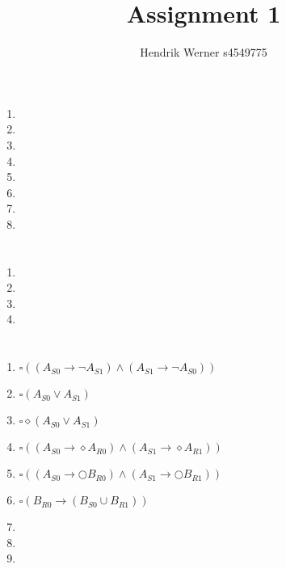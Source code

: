 \documentclass[12pt, a4paper]{article}
\title{Assignment 1}
\author{Hendrik Werner s4549775}
\begin{document}
\maketitle

\section{} %
\begin{enumerate}[a]
	\item %
	\item %
	\item %
	\item %
	\item %
	\item %
	\item %
	\item %
\end{enumerate}

\section{} %
\begin{enumerate}[a]
	\item %
	\item %
	\item %
	\item %
\end{enumerate}

\section{} %
\begin{enumerate}[a]
	\item %
	$\square ((A_{S0} \rightarrow \lnot A_{S1}) \land (A_{S1} \rightarrow \lnot A_{S0}))$
	\item %
	$\square (A_{S0} \lor A_{S1})$
	\item %
	$\square \diamond (A_{S0} \lor A_{S1})$
	\item %
	$\square ((A_{S0} \rightarrow \diamond A_{R0}) \land (A_{S1} \rightarrow \diamond A_{R1}))$
	\item %
	$\square ((A_{S0} \rightarrow \bigcirc B_{R0}) \land (A_{S1} \rightarrow \bigcirc B_{R1}))$
	\item %
	$\square (B_{R0} \rightarrow (B_{S0} \cup B_{R1}))$
	\item %
	\item %
	\item %
\end{enumerate}
\end{document}
